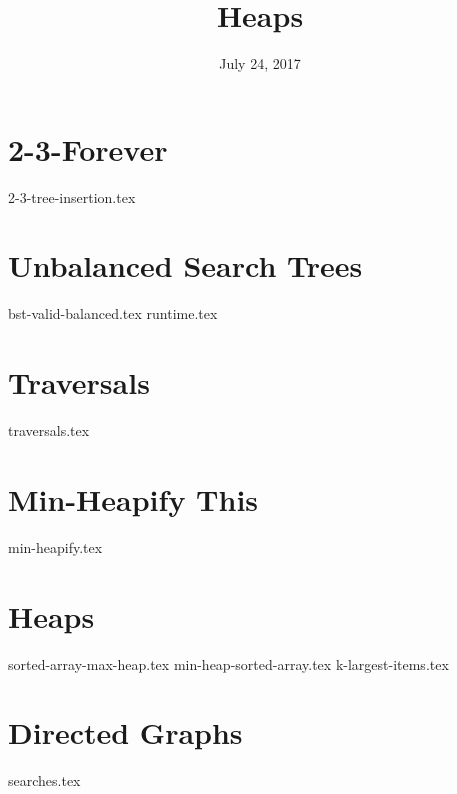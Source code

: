 \documentclass{exam}
\title{Heaps}
\date{July 24, 2017}
\begin{document}
\maketitle

\section{2-3-Forever}
\begin{questions}
{2-3-tree-insertion.tex}
\end{questions}

\section{Unbalanced Search Trees}
\begin{questions}
{bst-valid-balanced.tex}
\clearpage
{runtime.tex}
\end{questions}

\section{Traversals}
\begin{questions}
{traversals.tex}
\end{questions}

\clearpage

\section{Min-Heapify This}
\marginpar{\vspace{0in}{example-tree.tex}}
\begin{questions}
{min-heapify.tex}
\end{questions}

\section{Heaps}
\begin{questions}
{sorted-array-max-heap.tex}
{min-heap-sorted-array.tex}
{k-largest-items.tex}
\end{questions}

\clearpage

\section{Directed Graphs}
\begin{questions}
{searches.tex}
\end{questions}
\end{document}
